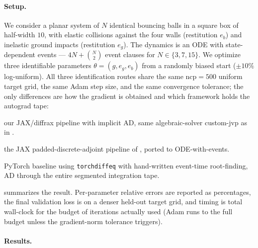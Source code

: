 \paragraph{Setup.}
We consider a planar system of $N$ identical bouncing balls in a square
box of half-width $10$, with elastic collisions against the four walls
(restitution $e_b$) and inelastic ground impacts (restitution $e_g$).
The dynamics is an ODE with state-dependent events --- $4N+\binom{N}{2}$
event clauses for $N\in\{3,7,15\}$. We optimize three identifiable
parameters $\theta=(g, e_g, e_b)$ from a randomly biased start
($\pm 10\%$ log-uniform). All three identification routes share the
same $\mathrm{ncp}{=}500$ uniform target grid, the same Adam step
size, and the same convergence tolerance; the only differences are
how the gradient is obtained and which framework holds the autograd
tape:
\begin{description}
  \setlength{\itemsep}{2pt}
  \item[\texttt{jax\_ad}] our JAX/diffrax pipeline with implicit AD,
  same algebraic-solver custom-jvp as in .
  \item[\texttt{jax\_da}] the JAX padded-discrete-adjoint pipeline of
  , ported to ODE-with-events.
  \item[\texttt{pytorch\_ad}] PyTorch baseline using \texttt{torchdiffeq}
  with hand-written event-time root-finding, AD through the entire
  segmented integration tape.
\end{description}

 summarizes the result. Per-parameter
relative errors are reported as percentages, the final validation
loss is on a denser held-out target grid, and timing is total
wall-clock for the budget of iterations actually used (Adam runs to
the full budget unless the gradient-norm tolerance triggers).

\paragraph{Results.}

